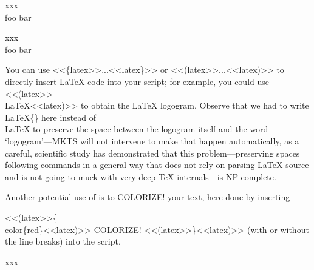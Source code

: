 
xxx {\mktsStyleCode{}\\foo} bar\mktsShowpar\par
xxx {\mktsStyleCode{}\\foo}
bar\mktsShowpar\par
\begin{multicols}{2}
You can use {\mktsStyleCode{}<<\{latex>>...<<latex\}>>} or {\mktsStyleCode{}<<(latex>>...<<latex)>>} to directly insert LaTeX
code into your script; for example, you could
use {\mktsStyleCode{}<<(latex>>\\LaTeX<<latex)>>}
to obtain the \LaTeX{} logogram.
Observe that we had to write {\mktsStyleCode{}\\LaTeX\{\}} here instead of {\mktsStyleCode{}\\LaTeX} to preserve the space between the logogram itself and
the word ‘logogram’—MKTS will not intervene to make that happen
automatically, as a careful, scientific study has demonstrated
that this problem—preserving spaces following commands in a
general way that does not rely on parsing \LaTeX{}
source and is not going to muck with very deep
\TeX{}
internals—is NP-complete.\mktsShowpar\par
Another potential use of  is to {\color{red}COLORIZE!} your text, here done by inserting\mktsShowpar\par
\begingroup\obeyalllines\mktsStyleCode{}<<(latex>>\{\\color\{red\}<<latex)>>
COLORIZE!
<<(latex>>\}<<latex)>>
\endgroup{}(with or without the line breaks) into the script.
\end{multicols}xxx\mktsShowpar\par

